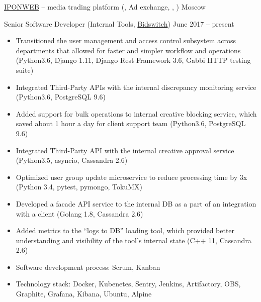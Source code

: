 \documentclass[unicode, 10pt, a4paper, oneside, fleqn]{article}
\begin{document}
\job  %
    {\href{http://www.iponweb.com}{IPONWEB} -- media trading platform
     (, Ad exchange, , )}
    {Moscow}
    {
        \position  %
        {Senior Software Developer (Internal Tools, \href{http://www.bidswitch.com/}{Bidswitch})}
        {June 2017 -- present}
        {
            \begin{itemize}
                \item{Transitioned the user management and access control subsystem
                      across departments that allowed for faster and simpler
                      workflow and operations (Python3.6, Django 1.11,
                      Django Rest Framework 3.6, Gabbi HTTP testing suite)}
                \item{Integrated Third-Party APIs with the internal
                      discrepancy monitoring service (Python3.6, PostgreSQL 9.6)}
                \item{Added support for bulk operations to internal creative
                      blocking service, which saved about 1 hour a day for client
                      support team (Python3.6, PostgreSQL 9.6)}
                \item{Integrated Third-Party API with the internal creative
                      approval service (Python3.5, asyncio, Cassandra 2.6)}
                \item{Optimized user group update microservice to reduce
                      processing time by 3x (Python 3.4, pytest, pymongo, TokuMX)}
                \item{Developed a facade API service to the internal DB as a part of
                      an integration with a client (Golang 1.8, Cassandra 2.6)}
                \item{Added metrics to the ``logs to DB'' loading tool, which provided
                      better understanding and visibility of the tool's internal state
                      (C++ 11, Cassandra 2.6)}
                \item{Software development process: Scrum, Kanban}
                \item{Technology stack: Docker, Kubenetes, Sentry, Jenkins,
                      Artifactory, OBS, Graphite, Grafana, Kibana, Ubuntu, Alpine}
            \end{itemize}
        }
        \position  %
}
\end{document}

